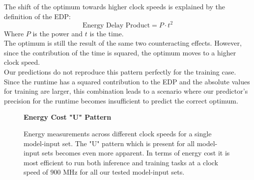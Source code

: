 \newpage


The shift of the optimum towards higher clock speeds is explained by the definition of the EDP: 
\begin{equation}\label{eq:edp}
    \text{Energy Delay Product} = P \cdot t^2
\end{equation}
Where $P$ is the power and $t$ is the time. \\
The optimum is still the result of the same two counteracting effects. However, since the contribution of the time is squared, the optimum moves to a higher clock speed. \\
Our predictions do not reproduce this pattern perfectly for the training case. Since the runtime has a squared contribution to the EDP and the absolute values for training are larger, this combination leads to a scenario where our predictor's precision for the runtime becomes insufficient to predict the correct optimum. 










\begin{figure}[htbp]
    \centering
    \parbox{0.7\textwidth}{\centering\textbf{Energy Cost "U" Pattern}}
    \caption{Energy measurements across different clock speeds for a single model-input set. The "U" pattern which is present for all model-input sets becomes even more apparent. In terms of energy cost it is most efficient to run both inference and training tasks at a clock speed of $900$ MHz for all our tested model-input sets.}
    \label{fig:pattern}
\end{figure}

